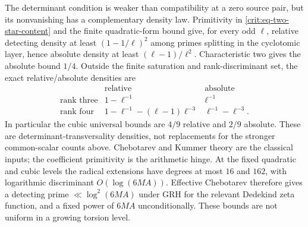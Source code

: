 \documentclass[11pt,oneside]{article}
\theoremstyle{definition}
\theoremstyle{remark}
\begin{document}
The determinant condition is weaker than compatibility at a zero source pair, but its
nonvanishing has a complementary density law.  Primitivity in
\eqref{crit:eq-two-star-content} and the finite quadratic-form bound give, for every odd
$\ell$, relative detecting density at least $(1-1/\ell)^2$ among primes splitting in the
cyclotomic layer, hence absolute density at least $(\ell-1)/\ell^2$.  Characteristic two
gives the absolute bound $1/4$.  Outside the finite saturation and rank-discriminant set,
the exact relative/absolute densities are
\begin{equation}
 \begin{array}{c|cc}
 &\text{relative}&\text{absolute}\\ \hline
 \text{rank three}&1-\ell^{-1}&\ell^{-1}\\[2pt]
 \text{rank four}&1-\ell^{-1}-(\ell-1)\ell^{-3}
                  &\ell^{-1}-\ell^{-3}.
 \end{array}
 \label{crit:eq-determinant-chebotarev-densities}
\end{equation}
In particular the cubic universal bounds are $4/9$ relative and $2/9$ absolute.  These
are determinant-transversality densities, not replacements for the stronger
common-scalar counts above.  Chebotarev and Kummer theory are the classical inputs; the
coefficient primitivity is the arithmetic hinge.
At the fixed quadratic and cubic levels the radical extensions have degrees at most $16$
and $162$, with logarithmic discriminant $O(\log(6MA))$.  Effective Chebotarev therefore
gives a detecting prime $\ll\log^2(6MA)$ under GRH for the relevant Dedekind zeta function,
and a fixed power of $6MA$ unconditionally.  These bounds are not uniform in a growing
torsion level.
\end{document}
